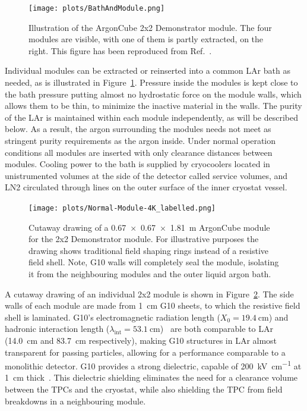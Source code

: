 \begin{figure}[htbp]
\centering
\texttt{[image: plots/BathAndModule.png]}
\caption{Illustration of the ArgonCube 2x2 Demonstrator module. The four modules are visible, with one of them is partly extracted, on the right. This figure has been reproduced from Ref.~\cite{argoncube_loi}.}
\label{fig:2x2_extraction}
\end{figure}

Individual modules can be extracted or reinserted into a common LAr bath as needed, as is illustrated in Figure~\ref{fig:2x2_extraction}. Pressure inside the modules is kept close to the bath pressure putting almost no hydrostatic force on the module walls, which allows them to be thin, to minimize the inactive material in the walls. The purity of the LAr is maintained within each module independently, as will be described below. As a result, the argon surrounding the modules needs not meet as stringent purity requirements as the argon inside. Under normal operation conditions all modules are inserted with only clearance distances between modules. Cooling power to the bath is supplied by cryocoolers located in unistrumented volumes at the side of the detector called service volumes, and LN2 circulated through lines on the outer surface of the inner cryostat vessel.

\begin{figure}[tbp]
  \centering
  \texttt{[image: plots/Normal-Module-4K\_labelled.png]}
  \caption[ArgonCube module engineering drawing]{Cutaway drawing of a \SI{0.67 x 0.67 x 1.81}{\metre} ArgonCube module for the 2x2 Demonstrator module. For illustrative purposes the drawing shows traditional field shaping rings instead of a resistive field shell. Note, G10 walls will completely seal the module, isolating it from the neighbouring modules and the outer liquid argon bath.}
  \label{fig:ac_module}
\end{figure}

A cutaway drawing of an individual 2x2 module is shown in Figure~\ref{fig:ac_module}. The side walls of each module are made from \SI{1}{\centi\metre} G10 sheets, to which the resistive field shell is laminated. G10's electromagnetic radiation length ($X_{\mathrm{0}} = \SI{19.4}{\centi\metre}$) and hadronic interaction length ($\lambda_{\mathrm{int}} = \SI{53.1}{\centi\metre}$)~\cite{pdg_g10} are both comparable to LAr (14.0~cm and 83.7~cm respectively), making G10 structures in LAr almost transparent for passing particles, allowing for a performance comparable to a monolithic detector. G10 provides a strong dielectric, capable of \SI{200}{\kilo\volt\per\centi\metre} at \SI{1}{\centi\metre} thick~\cite{G10Breakdown}. This dielectric shielding eliminates the need for a clearance volume between the TPCs and the cryostat, while also shielding the TPC from field breakdowns in a neighbouring module. 

